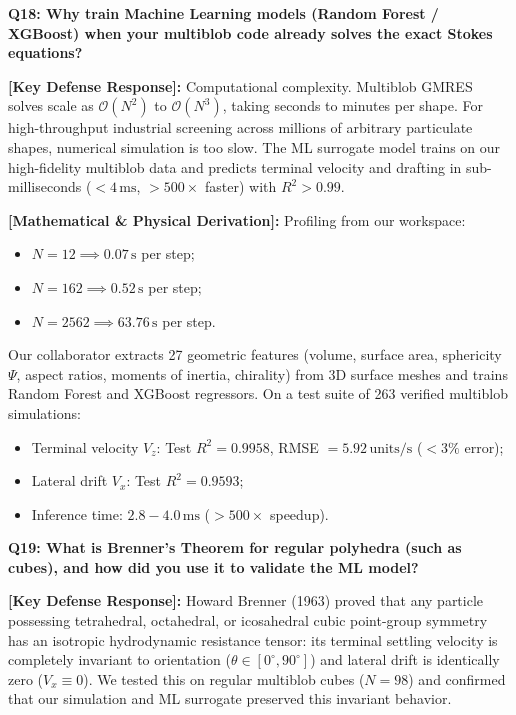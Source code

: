 \documentclass[11pt,a4paper]{article}
\newcommand{\question}[2]{
    \vspace{0.4cm}
    \noindent\colorbox{blue!10}{\parbox{\dimexpr\textwidth-2\fboxsep\relax}{
        \textbf{#1: #2}
    }}
    \vspace{0.2cm}
}
\newcommand{\shortanswer}[1]{
    \noindent\textbf{\textcolor{green!50!black}{[Key Defense Response]:}} #1
    \vspace{0.2cm}
}
\newcommand{\deepdetails}[1]{
    \noindent\textbf{\textcolor{blue!60!black}{[Mathematical \& Physical Derivation]:}} #1
    \vspace{0.2cm}
}
\begin{document}
\question{Q18}{Why train Machine Learning models (Random Forest / XGBoost) when your multiblob code already solves the exact Stokes equations?}

\shortanswer{Computational complexity. Multiblob GMRES solves scale as $\mathcal{O}(N^2)$ to $\mathcal{O}(N^3)$, taking seconds to minutes per shape. For high-throughput industrial screening across millions of arbitrary particulate shapes, numerical simulation is too slow. The ML surrogate model trains on our high-fidelity multiblob data and predicts terminal velocity and drafting in sub-milliseconds ($< 4\,\text{ms}$, $> 500\times$ faster) with $R^2 > 0.99$.}

\deepdetails{
Profiling from our workspace:
\begin{itemize}
    \item $N = 12 \implies 0.07\,\text{s}$ per step;
    \item $N = 162 \implies 0.52\,\text{s}$ per step;
    \item $N = 2562 \implies 63.76\,\text{s}$ per step.
\end{itemize}
Our collaborator extracts 27 geometric features (volume, surface area, sphericity $\Psi$, aspect ratios, moments of inertia, chirality) from 3D surface meshes and trains Random Forest and XGBoost regressors.
On a test suite of 263 verified multiblob simulations:
\begin{itemize}
    \item Terminal velocity $V_z$: Test $R^2 = 0.9958$, RMSE $= 5.92\,\text{units/s}$ ($< 3\%$ error);
    \item Lateral drift $V_x$: Test $R^2 = 0.9593$;
    \item Inference time: $2.8 - 4.0\,\text{ms}$ ($> 500\times$ speedup).
\end{itemize}
}

\vspace{0.4cm}
\question{Q19}{What is Brenner's Theorem for regular polyhedra (such as cubes), and how did you use it to validate the ML model?}

\shortanswer{Howard Brenner (1963) proved that any particle possessing tetrahedral, octahedral, or icosahedral cubic point-group symmetry has an isotropic hydrodynamic resistance tensor: its terminal settling velocity is completely invariant to orientation ($\theta \in [0^\circ, 90^\circ]$) and lateral drift is identically zero ($V_x \equiv 0$). We tested this on regular multiblob cubes ($N=98$) and confirmed that our simulation and ML surrogate preserved this invariant behavior.}
\end{document}
